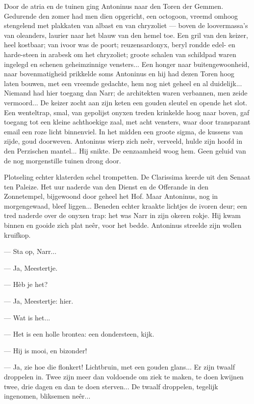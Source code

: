 \documentclass[a4paper, 12pt, oneside, dutch]{article}
\begin{document}
Door de atria en de tuinen ging Antoninus naar den Toren der Gemmen. Gedurende den zomer had men dien opgericht, een octogoon, vreemd omhoog stengelend met plakkaten van albast en van chryzoliet --- boven de loovermassa's van oleanders, laurier naar het blauw van den hemel toe. Een gril van den keizer, heel kostbaar; van ivoor was de poort; reuzensardonyx, beryl rondde edel- en harde-steen in arabesk om het chryzoliet; groote schalen van schildpad waren ingelegd en schenen geheimzinnige vensters... Een honger naar buitengewoonheid, naar bovenmatigheid prikkelde soms Antoninus en hij had dezen Toren hoog laten bouwen, met een vreemde gedachte, hem nog niet geheel en al duidelijk... Niemand had hier toegang dan Narr; de architekten waren verbannen, men zeide vermoord... De keizer zocht aan zijn keten een gouden sleutel en opende het slot. Een wenteltrap, smal, van gepolijst onyxen treden krinkelde hoog naar boven, gaf toegang tot een kleine achthoekige zaal, met acht vensters, waar door transparant email een roze licht binnenviel. In het midden een groote sigma, de kussens van zijde, goud doorweven. Antoninus wierp zich neêr, verveeld, hulde zijn hoofd in den Perzischen mantel... Hij snikte. De eenzaamheid woog hem. Geen geluid van de nog morgenstille tuinen drong door.

Plotseling echter klaterden schel trompetten. De Clarissima keerde uit den Senaat ten Paleize. Het uur naderde van den Dienst en de Offerande in den Zonnetempel, bijgewoond door geheel het Hof. Maar Antoninus, nog in morgengewaad, bleef liggen... Beneden echter kraakte lichtjes de ivoren deur; een tred naderde over de onyxen trap: het was Narr in zijn okeren rokje. Hij kwam binnen en gooide zich plat neêr, voor het bedde. Antoninus streelde zijn wollen kruifkop.

--- Sta op, Narr...

--- Ja, Meestertje.

--- Hèb je het?

--- Ja, Meestertje: hier.

--- Wat is het...

--- Het is een holle brontea: een dondersteen, kijk.

--- Hij is mooi, en bizonder!

--- Ja, zie hoe die flonkert! Lichtbruin, met een gouden glans... Er zijn twaalf droppelen in. Twee zijn meer dan voldoende om ziek te maken, te doen kwijnen twee, drie dagen en dan te doen sterven... De twaalf droppelen, tegelijk ingenomen, bliksemen neêr...
\end{document}
